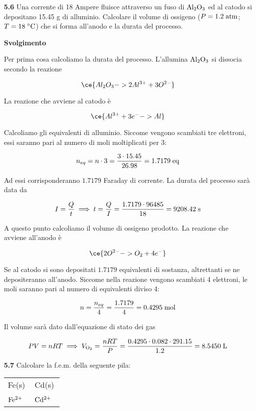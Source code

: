 \vspace{0.2cm}\textbf{5.6} Una corrente di 18 Ampere fluisce attraverso un fuso di $\rm Al_2O_3$ ed al catodo si depositano 15.45 g di alluminio. Calcolare il volume di ossigeno ($P=1.2 \; \rm atm$; $T=18\; ^{\circ} \rm C$) che si forma all'anodo e la
durata del processo.

\vspace{0.2cm}\large\textbf{Svolgimento}\normalsize

\vspace{0.2cm}Per prima cosa calcoliamo la durata del processo. L'allumina $\rm Al_2O_3$ si dissocia secondo la reazione 

$$\ce{Al_2O_3 -> 2Al^{3+} + 3O^{2-}}$$

La reazione che avviene al catodo è

$$\ce{Al^{3+} + 3e^- -> Al }$$

Calcoliamo gli equivalenti di alluminio. Siccome vengono scambiati tre elettroni, essi saranno pari al numero di moli moltiplicati per 3:

$$n_{eq}=n \cdot 3
=\frac{3 \cdot 15.45}{26.98}
=1.7179 \; \rm eq$$

Ad essi corrisponderanno $1.7179$ Faraday di corrente. La durata del processo sarà data da

$$I=\frac{Q}{t}
\implies
t=\frac{Q}{I}=\frac{1.7179 \cdot 96485}{18}
=9208.42 \; \rm s$$

A questo punto calcoliamo il volume di ossigeno prodotto. La reazione che avviene all'anodo è

$$\ce{2O^{2-} -> O_2 + 4e^-}$$

Se al catodo si sono depositati $1.7179$ equivalenti di sostanza, altrettanti se ne depositeranno all'anodo. Siccome nella reazione vengono scambiati 4 elettroni, le moli saranno pari al numero di equivalenti diviso 4:

$$n=\frac{n_{eq}}{4}
=\frac{1.7179}{4}
=0.4295 \; \rm mol$$

Il volume sarà dato dall'equazione di stato dei gas

$$PV=nRT
\implies
V_{\rm O_2}=\frac{nRT}{P}=\frac{0.4295 \cdot 0.082 \cdot 291.15}{1.2}=8.5450 \; \rm L$$

\vspace{0.2cm}\textbf{5.7} Calcolare la f.e.m. della seguente pila:

\begin{center}
    \begin{tabular}{|p{3.7cm}||p{3.7cm}|}
         Fe(s) & Cd(s)\\[0.5ex]
         $\rm Fe^{2+}$ \, \big[0.0120 M\big] & $\rm Cd^{2+}$ \, \big[0.8988 M\big] \\[0.5ex]
    \end{tabular}
\end{center}

